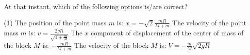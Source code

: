 
    \item At that instant, which of the following options is/are correct?
    \begin{tasks}(1)
        \task The position of the point mass \( m \) is: \( x = -\sqrt{2} \frac{mR}{M+m} \)
        \task The velocity of the point mass \( m \) is: \( v = \frac{2gR}{\sqrt{1 + \frac{m}{M}}} \)
        \task The \( x \) component of displacement of the center of mass of the block \( M \) is: \( - \frac{mR}{M+m} \)
        \task The velocity of the block \( M \) is: \( V = -\frac{m}{M} \sqrt{2gR} \)
    \end{tasks}
